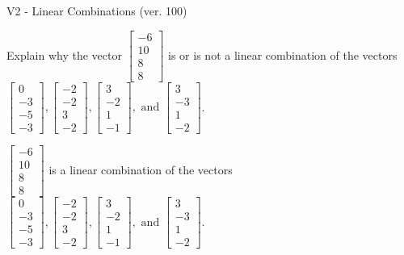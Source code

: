 \begin{exercise}
  \begin{exerciseTitle}V2 - Linear Combinations (ver. 100)\end{exerciseTitle}
  \begin{exerciseStatement}
    Explain why the vector \(\left[\begin{array}{c}
-6 \\
10 \\
8 \\
8
\end{array}\right]\)  is or is not a linear 
	combination of the vectors \(\left[\begin{array}{c}
0 \\
-3 \\
-5 \\
-3
\end{array}\right] , \left[\begin{array}{c}
-2 \\
-2 \\
3 \\
-2
\end{array}\right] , \left[\begin{array}{c}
3 \\
-2 \\
1 \\
-1
\end{array}\right] , \text{ and } \left[\begin{array}{c}
3 \\
-3 \\
1 \\
-2
\end{array}\right]\).
	


  \end{exerciseStatement}
  \begin{exerciseAnswer}
   \(\left[\begin{array}{c}
-6 \\
10 \\
8 \\
8
\end{array}\right]\) 
  	 is  
	a linear combination of the vectors \(\left[\begin{array}{c}
0 \\
-3 \\
-5 \\
-3
\end{array}\right] , \left[\begin{array}{c}
-2 \\
-2 \\
3 \\
-2
\end{array}\right] , \left[\begin{array}{c}
3 \\
-2 \\
1 \\
-1
\end{array}\right] , \text{ and } \left[\begin{array}{c}
3 \\
-3 \\
1 \\
-2
\end{array}\right]\).


\end{exerciseAnswer}
\end{exercise}
